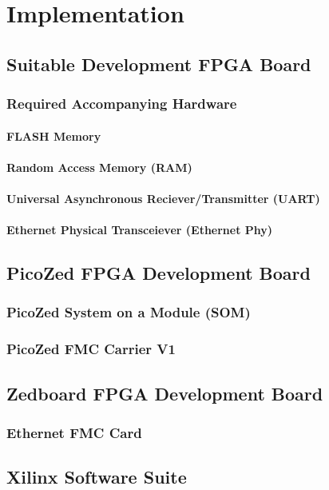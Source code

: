 \chapter{Implementation}\label{C:impl}

\section{Suitable Development FPGA Board}
\subsection{Required Accompanying Hardware}
\subsubsection{FLASH Memory}
\subsubsection{Random Access Memory (RAM)}
\subsubsection{Universal Asynchronous Reciever/Transmitter (UART)}
\subsubsection{Ethernet Physical Transceiever (Ethernet Phy)}
\section{PicoZed FPGA Development Board}
\subsection{PicoZed System on a Module (SOM)}
\subsection{PicoZed FMC Carrier V1}
\section{Zedboard FPGA Development Board}
\subsection{Ethernet FMC Card}
\section{Xilinx Software Suite}
